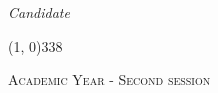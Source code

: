 \begin{titlepage}
\begin{center}
\begin{large}
\vspace{0pt} 

\begin{flushright}
\textit{Candidate}\\
\vspace{5pt} 
\myName
\end{flushright}
\end{large}

\vspace{20pt}

\line(1, 0){338} \\
\begin{normalsize}
\textsc{Academic Year \myAA - Second session}
\end{normalsize}

\end{center}
\end{titlepage}